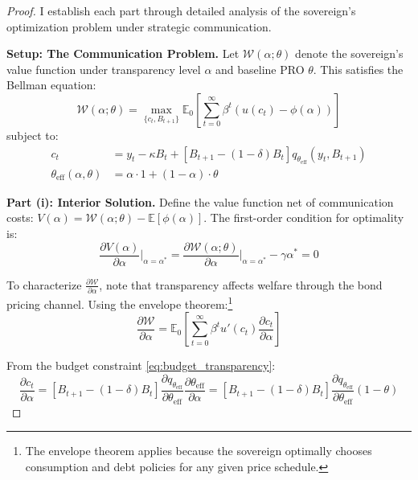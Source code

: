 \documentclass[12pt]{article}
\theoremstyle{plain}
\begin{document}
\begin{proof}
	I establish each part through detailed analysis of the sovereign's optimization problem under strategic communication.

	\textbf{Setup: The Communication Problem.}
	Let $\mathcal{W}(\alpha; \theta)$ denote the sovereign's value function under transparency level $\alpha$ and baseline PRO $\theta$. This satisfies the Bellman equation:
	\begin{equation}
		\mathcal{W}(\alpha; \theta) = \max_{\{c_t, B_{t+1}\}} \mathbb{E}_0 \left[ \sum_{t=0}^\infty \beta^t \left( u(c_t) - \phi(\alpha) \right) \right] \label{eq:welfare_transparency}
	\end{equation}
	subject to:
	\begin{align}
		c_t                                 & = y_t - \kappa B_t + [B_{t+1} - (1-\delta)B_t] q_{\theta_{\text{eff}}}(y_t, B_{t+1}) \label{eq:budget_transparency} \\
		\theta_{\text{eff}}(\alpha, \theta) & = \alpha \cdot 1 + (1-\alpha) \cdot \theta \label{eq:effective_theta_proof}
	\end{align}

	\textbf{Part (i): Interior Solution.}
	Define the value function net of communication costs: $V(\alpha) = \mathcal{W}(\alpha; \theta) - \mathbb{E}[\phi(\alpha)]$. The first-order condition for optimality is:
	\begin{equation}
		\frac{\partial V(\alpha)}{\partial \alpha}\bigg|_{\alpha=\alpha^*} = \frac{\partial \mathcal{W}(\alpha; \theta)}{\partial \alpha}\bigg|_{\alpha=\alpha^*} - \gamma \alpha^* = 0 \label{eq:foc_detailed}
	\end{equation}

	To characterize $\frac{\partial \mathcal{W}}{\partial \alpha}$, note that
	transparency affects welfare through the bond pricing channel. Using the
	envelope theorem:\footnote{The envelope theorem applies because the sovereign
		optimally chooses consumption and debt policies for any given price schedule.}
	\begin{equation}
		\frac{\partial \mathcal{W}}{\partial \alpha} = \mathbb{E}_0 \left[ \sum_{t=0}^\infty \beta^t u'(c_t) \frac{\partial c_t}{\partial \alpha} \right] \label{eq:welfare_derivative}
	\end{equation}

	From the budget constraint \eqref{eq:budget_transparency}:
	\begin{equation}
		\frac{\partial c_t}{\partial \alpha} = [B_{t+1} - (1-\delta)B_t] \frac{\partial q_{\theta_{\text{eff}}}}{\partial \theta_{\text{eff}}} \frac{\partial \theta_{\text{eff}}}{\partial \alpha} = [B_{t+1} - (1-\delta)B_t] \frac{\partial q_{\theta_{\text{eff}}}}{\partial \theta_{\text{eff}}} (1-\theta) \label{eq:consumption_derivative_alpha}
	\end{equation}


\end{proof}
\end{document}
